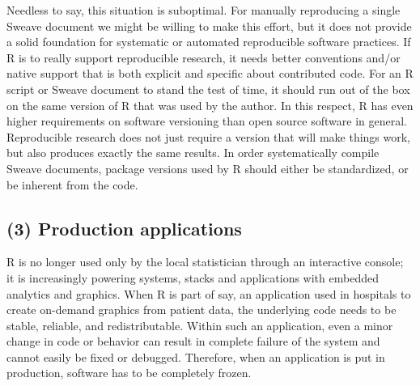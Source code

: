 Needless to say, this situation is suboptimal. For manually reproducing
a single Sweave document we might be willing to make this effort, but it does not
provide a solid foundation for systematic or automated reproducible software
practices. If R is to really support reproducible research, it needs better
conventions and/or native support that is both explicit and specific about
contributed code. For an R script or Sweave document to stand the test of
time, it should run out of the box on the same version of R that was used by
the author. In this respect, R has even higher requirements on software
versioning than open source software in general. Reproducible research does not
just require a version that will make things work, but also produces exactly the
same results. In order systematically compile Sweave documents, package versions
used by R should either be standardized, or be inherent from the code.

\subsection{(3) Production applications}

R is no longer used only by the local statistician through an interactive
console; it is increasingly powering systems, stacks and applications with
embedded analytics and graphics. When R is part of say, an application used in
hospitals to create on-demand graphics from patient data, the underlying code
needs to be stable, reliable, and redistributable. Within such an application,
even a minor change in code or behavior can result in complete failure of the
system and cannot easily be fixed or debugged. Therefore, when an application is
put in production, software has to be completely frozen.


